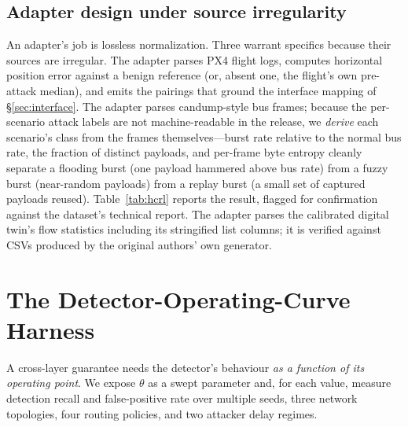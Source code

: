 \subsection{Adapter design under source irregularity}
An adapter's job is lossless normalization. Three warrant specifics because
their sources are irregular. The  adapter parses PX4
flight logs, computes horizontal position error against a benign reference (or,
absent one, the flight's own pre-attack median), and emits the
 pairings that ground the interface mapping of
\S\ref{sec:interface}. The  adapter parses candump-style
bus frames; because the per-scenario attack labels are not machine-readable in
the release, we \emph{derive} each scenario's class from the frames
themselves---burst rate relative to the normal bus rate, the fraction of
distinct payloads, and per-frame byte entropy cleanly separate a flooding burst
(one payload hammered above bus rate) from a fuzzy burst (near-random payloads)
from a replay burst (a small set of captured payloads reused).
Table~\ref{tab:hcrl} reports the result, flagged for confirmation against the
dataset's technical report. The  adapter parses the calibrated
digital twin's flow statistics including its stringified list columns; it is
verified against CSVs produced by the original authors' own generator.

\begin{table}[t]
\centering
\caption{Real ingested corpus. Counts are from schema-validated adapter outputs;
every record validates against the schema of \S\ref{sec:schema}.}
\label{tab:ingest}
\small
\renewcommand{\arraystretch}{1.1}

\end{table}

\begin{table}[t]
\centering
\caption{Frame-derived attack classes for the  scenarios,
inferred from burst rate, payload-distinct share, and byte entropy; scenarios
exhibiting more than one burst shape map to .}
\label{tab:hcrl}
\small
\renewcommand{\arraystretch}{1.05}

\end{table}

\section{The Detector-Operating-Curve Harness}
\label{sec:harness}
A cross-layer guarantee needs the detector's behaviour \emph{as a function of
its operating point}. We expose $\theta$ as a swept parameter and, for each
value, measure detection recall and false-positive rate over multiple seeds,
three network topologies, four routing policies, and two attacker delay regimes.

